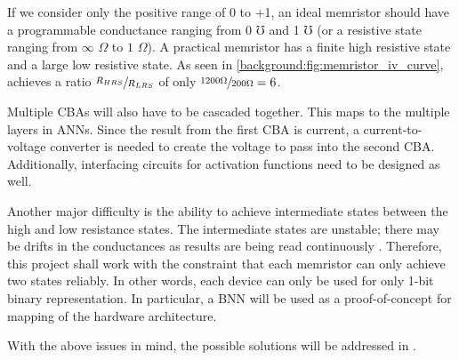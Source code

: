 If we consider only the positive range of 0 to +1, an ideal memristor should have a programmable conductance ranging from 0 $\mho$ and 1 $\mho$ (or a resistive state ranging from $\infty$ $\Omega$ to $1$ $\Omega$). A practical memristor has a finite high resistive state and a large low resistive state. As seen in \autoref{background:fig:memristor_iv_curve}, \citet{CAMPBELL201710} \cite{CAMPBELL201710} achieves a ratio $\sfrac{R_{HRS}}{R_{LRS}}$ of only $\sfrac{1200 \Omega}{200 \Omega} = 6$.

Multiple \acp{CBA} will also have to be cascaded together. This maps to the multiple layers in \acp{ANN}. Since the result from the first \ac{CBA} is current, a current-to-voltage converter is needed to create the voltage to pass into the second \ac{CBA}. Additionally, interfacing circuits for activation functions need to be designed as well.

Another major difficulty is the ability to achieve intermediate states between the high and low resistance states. The intermediate states are unstable; there may be drifts in the conductances as results are being read continuously \cite{Ielmini_2016}.
Therefore, this project shall work with the constraint that each memristor can only achieve two states reliably. In other words, each device can only be used for only 1-bit binary representation. In particular, a \ac{BNN} will be used as a proof-of-concept for mapping of the hardware architecture.

With the above issues in mind, the possible solutions will be addressed in .
